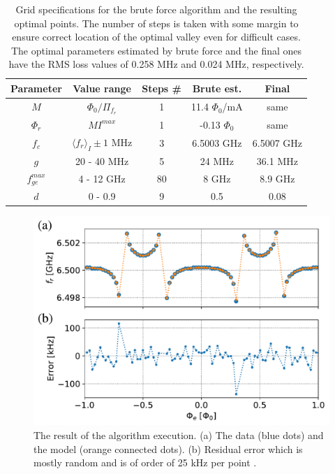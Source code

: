 \documentclass[%
 aip,
 amsmath,amssymb,
 reprint,%
]{revtex4-1}
\begin{document}
\begin{table}
	\centering
	\begin{ruledtabular}
		\begin{tabular}{ccccc} 
			Parameter & Value range & Steps \# & Brute est. & Final \\ 
			\hline
			$M$ & $\Phi_0/\Pi_{f_r}$ & 1 & 11.4 $\Phi_0$/mA &  same \\
			$\Phi_r$ & $M I^{max}$ & 1 & -0.13 $\Phi_0$ & same \\
			$f_c$ & $\langle f_r \rangle_{I} \pm 1$ MHz & 3 & 6.5003 GHz & 6.5007 GHz\\
			$g$ & 20 - 40 MHz & 5 & 24 MHz & 36.1 MHz \\
			$f_{ge}^{max}$ &  4 - 12 GHz & 80 & 8 GHz & 8.9 GHz\\
			$d$& 0 - 0.9 & 9 & 0.5 & 0.08\\ 
		\end{tabular} 
	\end{ruledtabular}
	\caption{Grid specifications for the brute force algorithm and the resulting optimal points. The number of steps is taken with some margin to ensure correct location of the optimal valley even for difficult cases. The optimal parameters estimated by brute force and the final ones have the RMS loss values of 0.258 MHz and 0.024 MHz, respectively.}
	\label{tab:grid}
\end{table}

\begin{figure}
	\centering
	\includegraphics[width=\linewidth]{fit}
	\caption{The result of the algorithm execution. (a) The data (blue dots) and the model (orange connected dots). (b) Residual error which is mostly random and is of order of 25 kHz per point .}
	\label{fig:anti_fit}
\end{figure}
\end{document}
